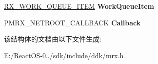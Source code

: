 \begin{DoxyCompactItemize}
\hyperlink{struct___r_x___w_o_r_k___q_u_e_u_e___i_t_e_m__}{R\+X\+\_\+\+W\+O\+R\+K\+\_\+\+Q\+U\+E\+U\+E\+\_\+\+I\+T\+EM} {\bfseries Work\+Queue\+Item}
\item 
\mbox{\label{struct___m_r_x___c_r_e_a_t_e_n_e_t_r_o_o_t___c_o_n_t_e_x_t_a23dc1821fbf4ff011a2a669bf1e368df}} 
P\+M\+R\+X\+\_\+\+N\+E\+T\+R\+O\+O\+T\+\_\+\+C\+A\+L\+L\+B\+A\+CK {\bfseries Callback}
\end{DoxyCompactItemize}


该结构体的文档由以下文件生成\+:\begin{DoxyCompactItemize}
\item 
E\+:/\+React\+O\+S-\/0../sdk/include/ddk/mrx.\+h\end{DoxyCompactItemize}
